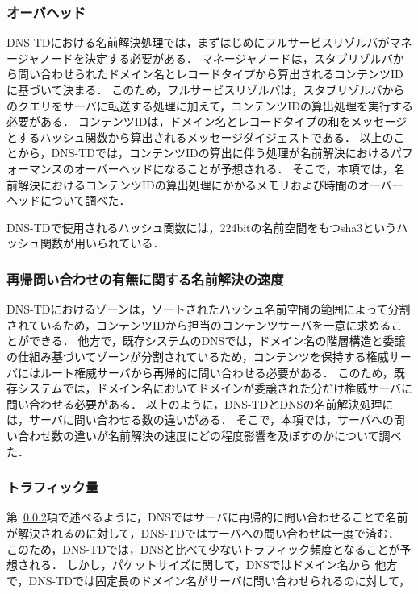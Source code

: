 \subsubsection{オーバヘッド}
DNS-TDにおける名前解決処理では，まずはじめにフルサービスリゾルバがマネージャノードを決定する必要がある．
マネージャノードは，スタブリゾルバから問い合わせられたドメイン名とレコードタイプから算出されるコンテンツIDに基づいて決まる．
このため，フルサービスリゾルバは，スタブリゾルバからのクエリをサーバに転送する処理に加えて，コンテンツIDの算出処理を実行する必要がある．
コンテンツIDは，ドメイン名とレコードタイプの和をメッセージとするハッシュ関数から算出されるメッセージダイジェストである．
以上のことから，DNS-TDでは，コンテンツIDの算出に伴う処理が名前解決におけるパフォーマンスのオーバーヘッドになることが予想される．
そこで，本項では，名前解決におけるコンテンツIDの算出処理にかかるメモリおよび時間のオーバーヘッドについて調べた．

DNS-TDで使用されるハッシュ関数には，224bitの名前空間をもつsha3というハッシュ関数が用いられている．


\subsubsection{再帰問い合わせの有無に関する名前解決の速度}
\label{sec:resolution_speed}
DNS-TDにおけるゾーンは，ソートされたハッシュ名前空間の範囲によって分割されているため，コンテンツIDから担当のコンテンツサーバを一意に求めることができる．
他方で，既存システムのDNSでは，ドメイン名の階層構造と委譲の仕組み基づいてゾーンが分割されているため，コンテンツを保持する権威サーバにはルート権威サーバから再帰的に問い合わせる必要がある．
このため，既存システムでは，ドメイン名においてドメインが委譲された分だけ権威サーバに問い合わせる必要がある．
以上のように，DNS-TDとDNSの名前解決処理には，サーバに問い合わせる数の違いがある．
そこで，本項では，サーバへの問い合わせ数の違いが名前解決の速度にどの程度影響を及ぼすのかについて調べた．

\subsubsection{トラフィック量}
第~\ref{sec:resolution_speed}項で述べるように，DNSではサーバに再帰的に問い合わせることで名前が解決されるのに対して，DNS-TDではサーバへの問い合わせは一度で済む．
このため，DNS-TDでは，DNSと比べて少ないトラフィック頻度となることが予想される．
しかし，パケットサイズに関して，DNSではドメイン名から
他方で，DNS-TDでは固定長のドメイン名がサーバに問い合わせられるのに対して，

